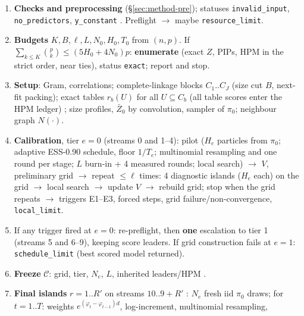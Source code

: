 \begin{tcolorbox}[sopbase,colback=white,colframe=black!60,title={SMC-BVS v3.1$(X,y,s)$ --- pipeline}]
\small
\begin{enumerate}[leftmargin=*,label=\arabic*.]
\item \textbf{Checks and preprocessing} (\S\ref{sec:method-pre}); statuses \texttt{invalid\_input}, \texttt{no\_predictors},
  \texttt{y\_constant} {\sffamily [v3.1: \texttt{degenerate\_n}, \texttt{unsupported\_size}; $n=2$ admitted]}. Preflight $\to$ maybe
  \texttt{resource\_limit}.
\item \textbf{Budgets} $K,B,\ell,L,N_0,H_0,T_0$ from $(n,p)$. If $\sum_{k\le K}\binom pk\le(5H_0+4N_0)p$: \textbf{enumerate} (exact $Z$,
  PIPs, HPM in the strict order, near ties), status \texttt{exact}; report and stop.
\item \textbf{Setup}: Gram, correlations; complete-linkage blocks $C_1..C_J$ (size cut $B$, next-fit packing); exact tables
  $r_b(U)$ for all $U\subseteq C_b$ (all table scores enter the HPM ledger) {}; size profiles,
  $\bar Z_0$ by convolution, sampler of $\pi_0$; neighbour graph $N(\cdot)$.
\item \textbf{Calibration}, tier $e=0$ (streams 0 and 1--4): pilot ($H_e$ particles from $\pi_0$; adaptive ESS-0.90 schedule,
  floor $1/T_e$; multinomial resampling and one round per stage; $L$ burn-in + 4 measured rounds; local search) $\to$ $V$,
  preliminary grid $\to$ repeat $\le\ell$ times: 4 diagnostic islands ($H_e$ each) on the grid {\sffamily [v3.1: concurrent]}
  $\to$ local search $\to$ update $V$ $\to$ rebuild grid; stop when the grid repeats $\to$ triggers E1--E3, forced steps,
  grid failure/non-convergence, \texttt{local\_limit}.
\item If any trigger fired at $e=0$: re-preflight, then \textbf{one} escalation to tier 1 (streams 5 and 6--9), keeping score
  leaders. If grid construction fails at $e=1$: \texttt{schedule\_limit} (best scored model returned).
\item \textbf{Freeze} $\mathcal C$: grid, tier, $N_e$, $L$, inherited leaders/HPM {\sffamily [v3.1: and $R'$, declared before stream 10;
  default $R'=4$; optional $R'=4k$ or $R'_n=4\lceil\log_2(n+p+1)\rceil$]}.
\item \textbf{Final islands} $r=1..R'$ on streams $10..9+R'$ {}:
  $N_e$ fresh iid $\pi_0$ draws; for $t=1..T$: weights $e^{(\varphi_t-\varphi_{t-1})d}$, log-increment, multinomial resampling,

\end{enumerate}
\end{tcolorbox}

